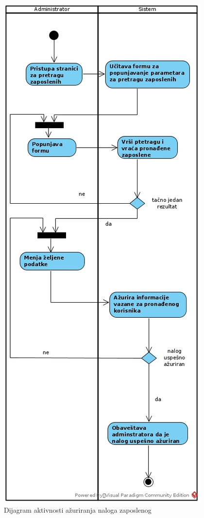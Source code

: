 \documentclass[a4paper]{article}
\begin{document}
\newpage
\begin{figure}[!ht]
\begin{center}
\includegraphics[scale=0.50]{sections/images/dijagram_aktivnosti_azuriranja_naloga_zaposlenog.jpg}
\end{center}
\caption{Dijagram aktivnosti ažuriranja naloga zaposlenog}
\label{fig:kontekst}
\end{figure}
\end{document}
